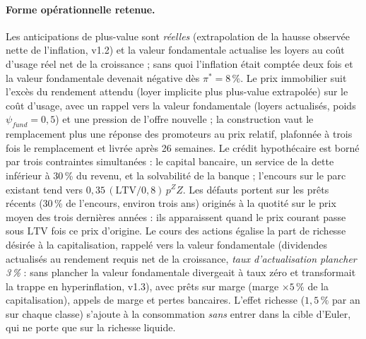 \documentclass[11pt,a4paper]{article}
\begin{document}
\paragraph{Forme opérationnelle retenue.} Les anticipations de plus-value sont \emph{réelles} (extrapolation de la hausse observée nette de l'inflation, v1.2) et la valeur fondamentale actualise les loyers au coût d'usage réel net de la croissance ; sans quoi l'inflation était comptée deux fois et la valeur fondamentale devenait négative dès $\pi^\ast=8\,\%$. Le prix immobilier suit l'excès du rendement attendu (loyer implicite plus plus-value extrapolée) sur le coût d'usage, avec un rappel vers la valeur fondamentale (loyers actualisés, poids $\psi_{fund}=0{,}5$) et une pression de l'offre nouvelle ; la construction vaut le remplacement plus une réponse des promoteurs au prix relatif, plafonnée à trois fois le remplacement et livrée après 26 semaines. Le crédit hypothécaire est borné par trois contraintes simultanées : le capital bancaire, un service de la dette inférieur à 30\,\% du revenu, et la solvabilité de la banque ; l'encours sur le parc existant tend vers $0{,}35\,(\mathrm{LTV}/0{,}8)\,p^ZZ$. Les défauts portent sur les prêts récents (30\,\% de l'encours, environ trois ans) originés à la quotité sur le prix moyen des trois dernières années : ils apparaissent quand le prix courant passe sous $\mathrm{LTV}$ fois ce prix d'origine. Le cours des actions égalise la part de richesse désirée à la capitalisation, rappelé vers la valeur fondamentale (dividendes actualisés au rendement requis net de la croissance, \emph{taux d'actualisation plancher 3\,\%} : sans plancher la valeur fondamentale divergeait à taux zéro et transformait la trappe en hyperinflation, v1.3), avec prêts sur marge (marge $\times5\,\%$ de la capitalisation), appels de marge et pertes bancaires. L'effet richesse ($1{,}5\,\%$ par an sur chaque classe) s'ajoute à la consommation \emph{sans} entrer dans la cible d'Euler, qui ne porte que sur la richesse liquide.
\end{document}
